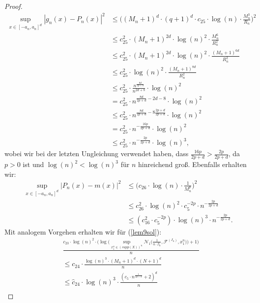\begin{proof}
\begin{equation}
\label{3rdsum}
\begin{split}
\sup_{x \in [-a_n, a_n]^d} |g_n(x) - P_n(x)|^2 & \leq \bigg((M_n + 1)^d \cdot (q + 1)^d \cdot c_{25}\cdot \log(n) \cdot \frac{M_n^3}{R_n}\bigg)^2 \\
& \leq c_{25}^2 \cdot (M_n + 1)^{2d} \cdot \log(n)^2 \cdot \frac{M_n^6}{R_n^2} \\
& \leq  c_{25}^2 \cdot (M_n + 1)^{2d} \cdot \log(n)^2 \cdot \frac{(M_n + 1)^{6d}}{R_n^2} \\
& \leq  c_{25}^2 \cdot \log(n)^2 \cdot \frac{(M_n + 1)^{8d}}{R_n^2} \\
& \leq c_{25}^2 \cdot \frac{n^{\frac{8d}{2p + d}}}{n^{2d + 8}} \cdot \log(n)^2 \\
& = c_{25}^2 \cdot n^{\frac{8d}{2p + d} - 2d -8} \cdot \log(n)^2 \\
& \leq c_{25}^2 \cdot n^{\frac{8d}{2p + d}  -8\frac{2p + d}{2p + d}} \cdot \log(n)^2 \\
& = c_{25}^2 \cdot n^{-\frac{16p}{2p + d}} \cdot \log(n)^2 \\
& \leq c_{25}^2 \cdot n^{-\frac{2p}{2p + d}} \cdot \log(n)^3,
\end{split}
\end{equation}
wobei wir bei der letzten Ungleichung verwendet haben, dass $\frac{16p}{2p + d} > \frac{2p}{2p + d}$, da $p > 0$ ist und $\log(n)^2 < \log(n)^3$ für $n$ hinreichend groß. Ebenfalls erhalten wir:
\begin{equation}
\label{4thsum}
\begin{split}
\sup_{x \in [-a_n, a_n]^d} |P_n(x) - m(x)|^2 & \leq \bigg(c_{26} \cdot \log(n) \cdot \frac{1}{M_n^p}\bigg)^2 \\
& \leq c_{26}^2 \cdot \log(n)^2 \cdot c_{5}^{-2p} \cdot n^{-\frac{2p}{2p + d}} \\
& \leq (c_{16}^2 \cdot c_{5}^{-2p}) \cdot \log(n)^3 \cdot n^{-\frac{2p}{2p + d}}.
\end{split}
\end{equation}
Mit analogem Vorgehen erhalten wir für (\ref{lem9sol}):
\begin{equation}
\begin{split}
& \frac{c_{23} \cdot \log(n)^2 \cdot \big(\log\big(\sup_{x_1^n \in (supp(X))^n}\mathcal{N}_1\big(\frac{1}{n \cdot \beta_n},\mathcal{F}^{(J_n)},x_1^n\big)\big) + 1\big)}{n} \\
& \leq c_{24} \cdot \frac{\log(n)^3 \cdot (M_n + 1)^d \cdot (N + 1)^d}{n} \\
& \leq \hat{c}_{24} \cdot \log(n)^3 \cdot \frac{(c_5 \cdot n^{\frac{1}{2p + d}} + 2)^d}{n} \\

\end{split}
\end{equation}
\end{proof}
